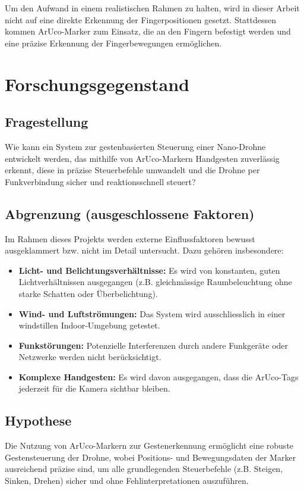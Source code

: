 Um den Aufwand in einem realistischen Rahmen zu halten, wird in dieser Arbeit nicht auf eine direkte Erkennung der Fingerpositionen gesetzt.
Stattdessen kommen ArUco-Marker zum Einsatz, die an den Fingern befestigt werden und eine präzise Erkennung der Fingerbewegungen ermöglichen.

\section{Forschungsgegenstand}
\subsection{Fragestellung}
Wie kann ein System zur gestenbasierten Steuerung einer Nano-Drohne entwickelt werden, das mithilfe von ArUco-Markern Handgesten zuverlässig erkennt, diese in präzise Steuerbefehle umwandelt und die Drohne per  Funkverbindung sicher und reaktionsschnell steuert?

\subsection{Abgrenzung (ausgeschlossene Faktoren)}
Im Rahmen dieses Projekts werden externe Einflussfaktoren bewusst ausgeklammert bzw. nicht im Detail untersucht.
Dazu gehören insbesondere:
\begin{itemize}
  \item \textbf{Licht- und Belichtungsverhältnisse:} Es wird von konstanten, guten Lichtverhältnissen ausgegangen (z.B. gleichmässige Raumbeleuchtung ohne starke Schatten oder Überbelichtung).
  \item \textbf{Wind- und Luftströmungen:} Das System wird ausschliesslich in einer windstillen Indoor-Umgebung getestet.
  \item \textbf{Funkstörungen:} Potenzielle Interferenzen durch andere Funkgeräte oder Netzwerke werden nicht berücksichtigt.
  \item \textbf{Komplexe Handgesten:} Es wird davon ausgegangen, dass die ArUco-Tags jederzeit für die Kamera sichtbar bleiben.
\end{itemize}

\subsection{Hypothese}
Die Nutzung von ArUco-Markern zur Gestenerkennung ermöglicht eine robuste Gestensteuerung der Drohne, wobei Positions- und Bewegungsdaten der Marker ausreichend präzise sind, um alle grundlegenden Steuerbefehle (z.B. Steigen, Sinken, Drehen) sicher und ohne Fehlinterpretationen auszuführen.

\endgroup